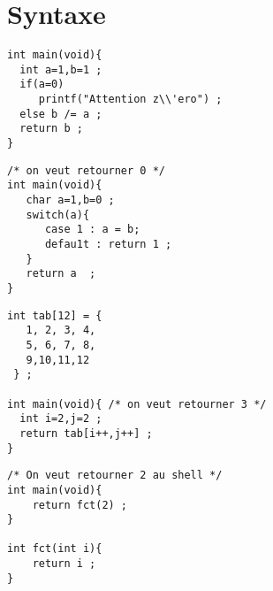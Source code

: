\section{Syntaxe}
\begin{frame}[fragile]
\begin{verbatim}
int main(void){
  int a=1,b=1 ; 
  if(a=0) 
     printf("Attention z\\'ero") ;
  else b /= a ;
  return b ;
}
\end{verbatim}
\end{frame}
\begin{frame}[fragile]
\begin{verbatim}
/* on veut retourner 0 */
int main(void){
   char a=1,b=0 ;
   switch(a){
      case 1 : a = b;
      defau1t : return 1 ; 
   }
   return a  ;
}
\end{verbatim}
\end{frame}
\begin{frame}[fragile]
\begin{verbatim}
int tab[12] = {
   1, 2, 3, 4,
   5, 6, 7, 8,
   9,10,11,12
 } ;

int main(void){ /* on veut retourner 3 */
  int i=2,j=2 ;
  return tab[i++,j++] ;
}
\end{verbatim}
\end{frame}
\begin{frame}[fragile]
\begin{verbatim}
/* On veut retourner 2 au shell */
int main(void){
    return fct(2) ; 
}

int fct(int i){ 
    return i ; 
}
\end{verbatim}
\end{frame}
